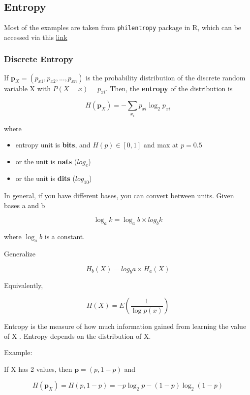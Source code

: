 \documentclass[
]{book}
\providecommand{\tightlist}{%
  \setlength{\itemsep}{0pt}\setlength{\parskip}{0pt}}
\begin{document}
\hypertarget{entropy}{%
\subsection{Entropy}\label{entropy}}

Most of the examples are taken from \texttt{philentropy} package in R, which can be accessed via this
\href{https://cran.r-project.org/web/packages/philentropy/vignettes/Information_Theory.html}{link}

\hypertarget{discrete-entropy}{%
\subsubsection{Discrete Entropy}\label{discrete-entropy}}

If \(\mathbf{p}_X = (p_{x1},p_{x2},...,p_{xn})\) is the probability distribution of the discrete random variable X with
\(P(X = x) = p_{xi}\). Then, the \textbf{entropy} of the distribution is \citep{Shannon_1948}

\[
H(\mathbf{p}_X) = -\sum_{x_i} p_{xi}\log_2 p_{xi}
\]

where

\begin{itemize}
\tightlist
\item
  entropy unit is \textbf{bits}, and \(H(p) \in [0,1]\) and max at \(p = 0.5\)
\item
  or the unit is \textbf{nats} (\(log_e\))
\item
  or the unit is \textbf{dits} (\(log_{10}\))
\end{itemize}

In general, if you have different bases, you can convert between units. Given bases a and b

\[
\log_a k = \log_a b \times log_b k 
\]

where \(\log_a b\) is a constant.

Generalize

\[
H_b(X) = log_b a \times H_a(X)
\]

Equivalently,

\[
H(X) = E(\frac{1}{\log p(x)})
\]

Entropy is the measure of how much information gained from learning the value of X \citep[pp.262]{Zwillinger_1995}. Entropy
depends on the distribution of X.

\hfill\break
Example:

If X has 2 values, then \(\mathbf{p}= (p,1-p)\) and

\[
H(\mathbf{p}_X ) = H(p,1-p) = -p \log_2 p - (1-p) \log_2 (1-p)
\]
\end{document}
